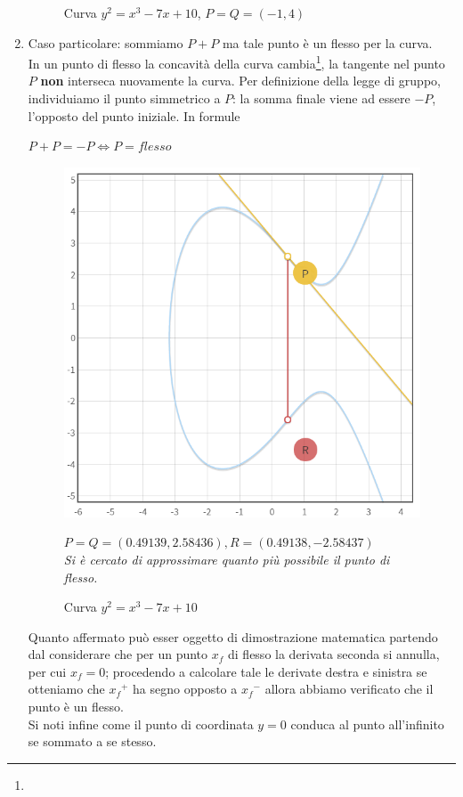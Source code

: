 \documentclass[a4paper,12pt]{tesiinfo}
\renewcommand{\footnotesize}{\fontsize{9pt}{11pt}\selectfont}
\begin{document}
\begin{enumerate}
\begin{figure}[H]
  \caption{Curva $y^2 = x^3-7x+10$, $P=Q=(-1, 4)$}
 \end{figure}
 \item Caso particolare: sommiamo $P+P$ ma tale punto \`e un flesso per la curva. 
 \\
 In un punto di flesso la concavit\`a della curva cambia\footnote{\footnotesize{In ogni curva ellittica esistono esattamente 9 punti di flesso: 4 punti con coordinata $y$ positiva, altri 4 corrispondenti ai loro simmetrici ed, infine, il punto all'infinito.}}, la tangente nel punto $P$ \textbf{non} interseca nuovamente la curva. Per definizione della legge di gruppo, individuiamo il punto simmetrico a $P$: la somma finale viene ad essere $-P$, l'opposto del punto iniziale. In formule
 \begin{center}
  $P+P=-P \iff P = flesso$
 \end{center}
 \begin{figure}[H]
  \includegraphics[width=.6\textwidth,center]{Flesso2}
  \caption{Curva $y^2 = x^3-7x+10$}
  \begin{center}
  $P=Q=(0.49139, 2.58436), R=(0.49138, -2.58437)$
  \\
  \textit{Si \`e cercato di approssimare quanto pi\`u possibile il punto di flesso.}
  \end{center}
 \end{figure}
 Quanto affermato pu\`o esser oggetto di dimostrazione matematica partendo dal considerare che per un punto $x_f$ di flesso la derivata seconda si annulla, per cui $x_f=0$; procedendo a calcolare tale le derivate destra e sinistra se otteniamo che ${x_f}^+$ ha segno opposto a ${x_f}^-$ allora abbiamo verificato che il punto \`e un flesso.
 \\
 Si noti infine come il punto di coordinata $y=0$ conduca al punto all'infinito se sommato a se stesso.
\end{enumerate}
\end{document}
